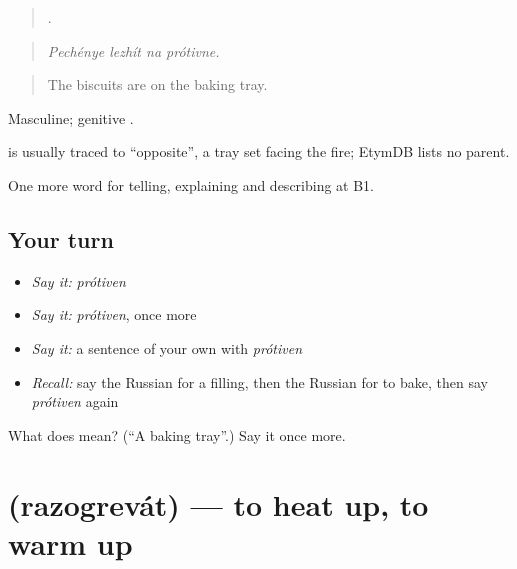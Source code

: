 \begin{quote}
   .
\end{quote}

\begin{quote}
\emph{Pechénye lezhít na prótivne.}
\end{quote}

\begin{quote}
The biscuits are on the baking tray.
\end{quote}

Masculine; genitive \emph{}.

\begin{cousinweb}
\emph{} is usually traced to \emph{} \textquotedblleft{}opposite\textquotedblright{}, a tray set facing the fire; EtymDB lists no parent.
\end{cousinweb}

\begin{grammarlens}[title={What you've built}]
One more word for telling, explaining and describing at B1.
\end{grammarlens}

\subsection*{Your turn}
\begin{itemize}
\raggedright
  \item \emph{Say it:} \emph{prótiven}
  \item \emph{Say it:} \emph{prótiven}, once more
  \item \emph{Say it:} a sentence of your own with \emph{prótiven}
  \item \emph{Recall:} say the Russian for a filling, then the Russian for to bake, then say \emph{prótiven} again
\end{itemize}

\begin{tcolorbox}[breakable,colback=teal!4,colframe=teal!35!black,title={Before you move on}]
What does  mean? (\textquotedblleft{}A baking tray\textquotedblright{}.) Say it once more.
\end{tcolorbox}
\section[\texorpdfstring{\ru{разогревать} (razogrevát)}{разогревать (razogrevát)}]{ (razogrevát) — to heat up, to warm up}

